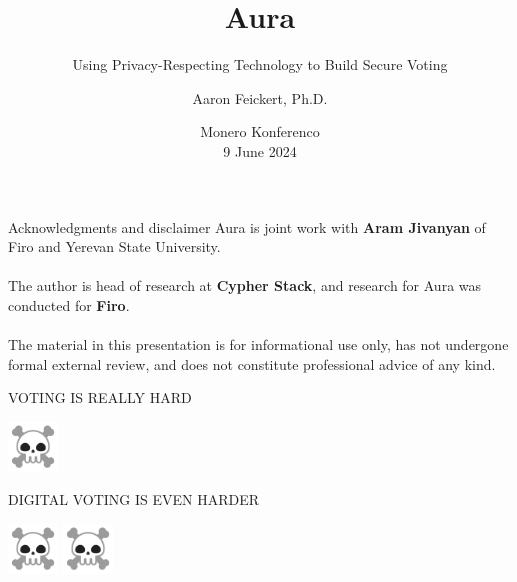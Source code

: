 \documentclass[aspectratio=169]{beamer}
\title{Aura}
\subtitle{Using Privacy-Respecting Technology to Build Secure Voting}
\author{Aaron Feickert, Ph.D.}
\date{Monero Konferenco \\ 9 June 2024}
\begin{document}
\frame{\titlepage}

\begin{frame}{Acknowledgments and disclaimer}
	Aura is joint work with \textbf{Aram Jivanyan} of Firo and Yerevan State University. \\~\\

	The author is head of research at \textbf{Cypher Stack}, and research for Aura was conducted for \textbf{Firo}. \\~\\

	The material in this presentation is for informational use only, has not undergone formal external review, and does not constitute professional advice of any kind.
\end{frame}

\begin{frame}
    \begin{center}
        \Huge VOTING IS REALLY HARD
    \end{center}
    \vspace{30px}
    \begin{center}
        \includegraphics[width=50px]{images/skull.png}
    \end{center}
\end{frame}

\begin{frame}
    \begin{center}
        \Huge DIGITAL VOTING IS EVEN HARDER
    \end{center}
    \vspace{30px}
    \begin{center}
        \includegraphics[width=50px]{images/skull.png}
        \includegraphics[width=50px]{images/skull.png}
    \end{center}
\end{frame}
\end{document}
